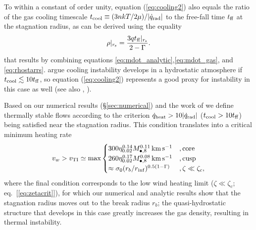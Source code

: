 \documentclass[usenatbib,fleqn]{mn2e}
\newcommand{\tff}{t_{\rm ff}}
\begin{document}
To within a constant of order unity, equation (\ref{eq:cooling2}) also
equals the ratio of the gas cooling timescale $t_{\rm cool} \equiv (3n
kT/2 \mu)/|\dot{q}_{\rm rad}|$ to the free-fall time $t_{\rm ff}$ at the
stagnation radius, as can be derived using the equality
\begin{align}
\rho|_{r_{\rm s}}=\frac{3 q\tff|_{r_{\rm s}}}{2-\Gamma}.
\label{eq:rhors2}
\end{align}
that results by combining equations
\eqref{eq:mdot_analytic},\eqref{eq:mdot_gas}, and
\eqref{eq:rhostarrs}.  \citet{McCourt+12} argue cooling instability
develops in a hydrostatic atmosphere if $t_{\rm cool} \lesssim 10 t_{\rm ff}$,
so equation (\ref{eq:cooling2}) represents a good proxy for
instability in this case as well (see also \citealt{Li&Bryan14a}, \citealt{Li&Bryan14b}).

Based on our numerical results (\S \ref{sec:numerical}) and the work of \citet{McCourt+12} we define thermally stable flows according to the criterion $\dot{q}_{\rm heat} > 10|\dot{q}_{\rm rad}|$ ($t_{\rm
  cool} > 10t_{\rm ff}$) being satisfied near the stagnation radius.  This condition translates into a
critical minimum heating rate
\begin{align}
v_{w} > v_{\rm TI} \simeq
  {\rm max}\begin{cases}
   300 \eta_{0.02}^{0.14} M_{\bullet,8}^{0.11}\,{\rm km\,s^{-1}}  &, \text{core}\\
   260 \eta_{0.02}^{0.17} M_{\bullet,8}^{0.08}\,{\rm km\,s^{-1}}   &, \text{cusp}  \\
\approx \sigma_0(r_{b}/r_{\rm inf})^{0.5(1-\Gamma)} &, \zeta \ll \zeta_c, 
  \end{cases}
  \label{eq:cooling3}
\end{align}
where the final condition corresponds to the low wind heating limit
($\zeta \ll \zeta_c$; eq.~[\ref{eq:zetacrit}]), for which our
numerical and analytic results show that the stagnation radius moves
out to the break radius $r_b$; the quasi-hydrostatic structure that
develops in this case greatly increases the gas density, resulting in
thermal instability.
\end{document}
